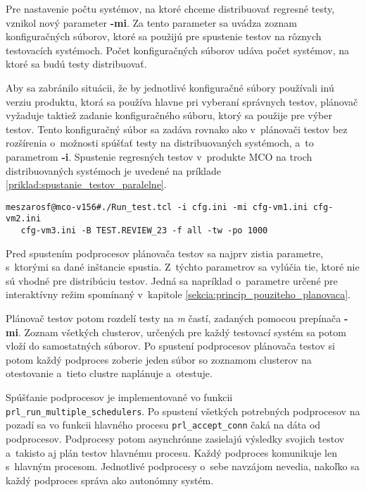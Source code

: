 Pre nastavenie počtu systémov, na ktoré chceme distribuovať  
regresné testy, vznikol nový parameter \textbf{-mi}.
Za tento parameter sa uvádza zoznam konfiguračných súborov, ktoré sa 
použijú pre spustenie testov na rôznych testovacích systémoch. 
Počet konfiguračných súborov udáva počet systémov, na ktoré sa budú 
testy distribuovať.

Aby sa zabránilo situácii, že by jednotlivé konfiguračné súbory používali 
inú verziu produktu, ktorá sa používa hlavne pri vyberaní správnych testov, 
plánovač vyžaduje taktiež zadanie konfiguračného súboru, ktorý
sa použije pre výber testov. 
Tento konfiguračný súbor sa zadáva rovnako ako v~plánovači testov 
bez rozšírenia o~možnosti spúšťať testy na distribuovaných systémoch, 
a~to parametrom \textbf{-i}.
Spustenie regresných testov v~produkte MCO na troch distribuovaných 
systémoch je uvedené na príklade
\ref{priklad:spustanie_testov_paralelne}.

\begin{lstlisting}[caption=Príkaz pre distribúciu regresných testov v~
produkte MCO na 3 testovacie systémy,
label=priklad:spustanie_testov_paralelne]
meszarosf@mco-v156#./Run_test.tcl -i cfg.ini -mi cfg-vm1.ini cfg-vm2.ini 
   cfg-vm3.ini -B TEST.REVIEW_23 -f all -tw -po 1000
\end{lstlisting}

Pred spustením podprocesov plánovača testov sa najprv zistia parametre, 
s~ktorými sa dané  inštancie spustia. 
Z~týchto parametrov sa vylúčia tie, ktoré nie sú vhodné pre
distribúciu testov. Jedná sa napríklad o~parametre určené pre 
interaktívny režim spomínaný v~kapitole 
\ref{sekcia:princip_pouziteho_planovaca}.

Plánovač testov potom rozdelí testy na \textit{m} častí, zadaných pomocou 
prepínača \textbf{-mi}. Zoznam všetkých clusterov, určených pre každý 
testovací systém sa potom vloží do samostatných súborov.
Po spustení podprocesov plánovača testov si potom každý podproces zoberie 
jeden súbor so zoznamom clusterov na otestovanie a~tieto clustre 
naplánuje a~otestuje.

Spúšťanie podprocesov je implementované vo funkcii 
\texttt{prl\_run\_multiple\_schedulers}.
Po spustení všetkých potrebných podprocesov na pozadí sa vo funkcii 
hlavného procesu \texttt{prl\_accept\_conn} čaká na dáta od podprocesov.
Podprocesy potom asynchrónne zasielajú výsledky svojich testov 
a~takisto aj plán testov hlavnému procesu. 
Každý podproces komunikuje len s~hlavným procesom. 
Jednotlivé podprocesy o~sebe navzájom nevedia, nakoľko sa každý podproces 
správa ako autonómny systém. 

